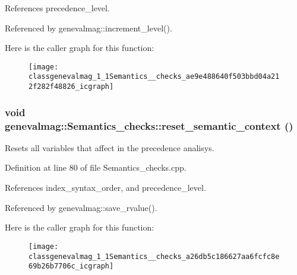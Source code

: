 References precedence\_\-level.



Referenced by genevalmag::increment\_\-level().



Here is the caller graph for this function:\nopagebreak
\begin{figure}[H]
\begin{center}
\leavevmode
\texttt{[image: classgenevalmag\_1\_1Semantics\_\_checks\_ae9e488640f503bbd04a212f282f48826\_icgraph]}
\end{center}
\end{figure}


\hypertarget{classgenevalmag_1_1Semantics__checks_a26db5c186627aa6fcfc8e69b26b7706c}{
\subsubsection[{reset\_\-semantic\_\-context}]{\setlength{\rightskip}{0pt plus 5cm}void genevalmag::Semantics\_\-checks::reset\_\-semantic\_\-context ()}}
\label{classgenevalmag_1_1Semantics__checks_a26db5c186627aa6fcfc8e69b26b7706c}
Resets all variables that affect in the precedence analisys. 

Definition at line 80 of file Semantics\_\-checks.cpp.



References index\_\-syntax\_\-order, and precedence\_\-level.



Referenced by genevalmag::save\_\-rvalue().



Here is the caller graph for this function:\nopagebreak
\begin{figure}[H]
\begin{center}
\leavevmode
\texttt{[image: classgenevalmag\_1\_1Semantics\_\_checks\_a26db5c186627aa6fcfc8e69b26b7706c\_icgraph]}
\end{center}
\end{figure}




